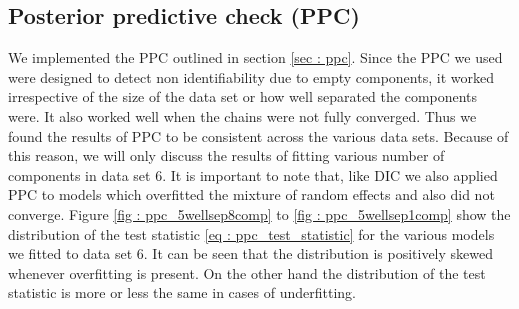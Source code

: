 \subsection{Posterior predictive check (PPC)}
\label{subsec : ppc_simulation}
We implemented the PPC outlined in section \ref{sec : ppc}. Since the PPC we used were designed to detect non identifiability due to empty components, it worked irrespective of the size of the data set or how well separated the components were. It also worked well when the chains were not fully converged. Thus we found the results of PPC to be consistent across the various data sets. Because of this reason, we will only discuss the results of fitting various number of components in data set 6. It is important to note that, like DIC we also applied PPC to models which overfitted the mixture of random effects and also did not converge. Figure \ref{fig : ppc_5wellsep8comp} to \ref{fig : ppc_5wellsep1comp} show the distribution of the test statistic \ref{eq : ppc_test_statistic} for the various models we fitted to data set 6. It can be seen that the distribution is positively skewed whenever overfitting is present. On the other hand the distribution of the test statistic is more or less the same in cases of underfitting.\\

